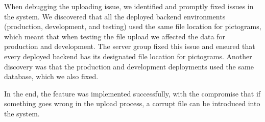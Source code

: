 When debugging the uploading issue, we identified and promptly fixed issues in the system. We discovered that all the deployed backend environments (production, development, and testing) used the same file location for pictograms, which meant that when testing the file upload we affected the data for production and development. The server group fixed this issue and ensured that every deployed backend has its designated file location for pictograms. Another discovery was that the production and development deployments used the same database, which we also fixed.

In the end, the feature was implemented successfully, with the compromise that if something goes wrong in the upload process, a corrupt file can be introduced into the system.
